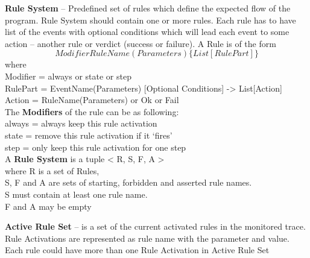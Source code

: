 \documentclass[a4paper]{article}
\begin{document}
\vfill

\textbf{Rule System} – Predefined set of rules which define the expected flow of the program. Rule System should contain one or more rules. Each rule has to have list of the events with optional conditions which will lead each event to some action – another rule or verdict (success or failure). A Rule is of the form
\[
Modifier RuleName(Parameters) \{
List[RulePart]
\}
\]
where\\
Modifier = always or state or step\\
RulePart = EventName(Parameters) [Optional Conditions] -> List[Action]\\
Action = RuleName(Parameters) or Ok or Fail\\


The \textbf{Modifiers} of the rule can be as following:\\
always = always keep this rule activation\\
state = remove this rule activation if it ‘fires’\\
step = only keep this rule activation for one step\\

A \textbf{Rule System} is a tuple < R, S, F, A >\\
where R is a set of Rules,\\
S, F and A are sets of starting, forbidden and asserted rule names.\\
S must contain at least one rule name.\\
F and A may be empty 

\vfill

\vfill

\textbf{Active Rule Set} – is a set of the current activated rules in the monitored trace. Rule Activations are represented as rule name with the parameter and value. Each rule could have more than one Rule Activation in Active Rule Set 
\end{document}
